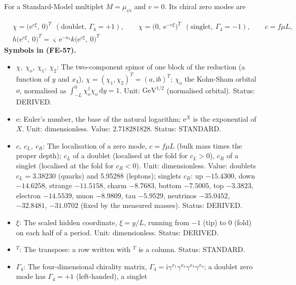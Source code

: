 \documentclass[
  10pt,
]{article}
\providecommand{\tightlist}{%
  \setlength{\itemsep}{0pt}\setlength{\parskip}{0pt}}
\begin{document}
For a Standard-Model multiplet \(M = \mu_{\psi i}\) and \(v = 0\). Its
chiral zero modes are

\[
\begin{aligned}
&\chi = \big(\mathrm{e}^{c\xi},\ 0\big)^T\ \ (\text{doublet},\ \Gamma_4 = +1),\qquad
 \chi = \big(0,\ \mathrm{e}^{-c\xi}\big)^T\ \ (\text{singlet},\ \Gamma_4 = -1),\qquad c = f\mu L,\\
&h\big(\mathrm{e}^{c\xi},\ 0\big)^T = \varsigma\,\mathrm{e}^{-a_4}k\big(\mathrm{e}^{c\xi},\ 0\big)^T
\end{aligned} \tag{FE-57}
\] \textbf{Symbols in (FE-57).}

\begin{itemize}
\tightlist
\item
  \(\chi,\ \chi_o,\ \chi_1,\ \chi_2\): The two-component spinor of one
  block of the reduction (a function of \(y\) and \(x_4\)),
  \(\chi = (\chi_1, \chi_2)^T = (a, \mathrm{i}b)^T\); \(\chi_o\) the
  Kohn-Sham orbital \(o\), normalised as
  \(\int_{-L}^{0}\chi_o^\dagger\chi_o\,\mathrm{d}y = 1\). Unit:
  \(\mathrm{GeV}^{1/2}\) (normalised orbital). Status: DERIVED.
\item
  \(\mathrm{e}\): Euler's number, the base of the natural logarithm;
  \(\mathrm{e}^{X}\) is the exponential of \(X\). Unit: dimensionless.
  Value: 2.718281828. Status: STANDARD.
\item
  \(c,\ c_L,\ c_R\): The localisation of a zero mode, \(c = f\mu L\)
  (bulk mass times the proper depth); \(c_L\) of a doublet (localised at
  the fold for \(c_L > 0\)), \(c_R\) of a singlet (localised at the fold
  for \(c_R < 0\)). Unit: dimensionless. Value: doublets
  \(c_L = 3.38230\) (quarks) and 5.95288 (leptons); singlets \(c_R\): up
  \(-15.4300\), down \(-14.6258\), strange \(-11.5158\), charm
  \(-8.7683\), bottom \(-7.5005\), top \(-3.3823\), electron
  \(-14.5539\), muon \(-8.9809\), tau \(-5.9529\), neutrinos
  \(-35.0452\), \(-32.8481\), \(-31.0702\) (fixed by the measured
  masses). Status: DERIVED.
\item
  \(\xi\): The scaled hidden coordinate, \(\xi = y/L\), running from
  \(-1\) (tip) to \(0\) (fold) on each half of a period. Unit:
  dimensionless. Status: DERIVED.
\item
  \({}^T\): The transpose: a row written with \(^T\) is a column.
  Status: STANDARD.
\item
  \(\Gamma_4\): The four-dimensional chirality matrix,
  \(\Gamma_4 = \mathrm{i}\gamma^{x_1}\gamma^{x_2}\gamma^{x_3}\gamma^{x_4}\);
  a doublet zero mode has \(\Gamma_4 = +1\) (left-handed), a singlet

\end{itemize}
\end{document}
